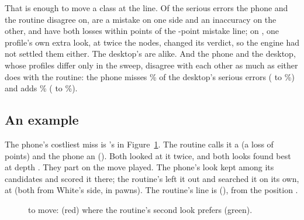 \documentclass[11pt]{article}
\begin{document}
That is enough to move a class at the line. Of the \PhoneDisagree{} serious errors the phone and the
routine disagree on, \PhoneFlips{} are a mistake on one side and an inaccuracy on the other, and
\PhoneNear{} have both losses within \Near{} points of the \MistakeLine-point mistake line; on
\PhoneUnsettled, one profile's own extra look, at twice the nodes, changed its verdict, so the engine
had not settled them either. The desktop's are alike. And the phone and the desktop, whose profiles
differ only in the sweep, disagree with each other as much as either does with the routine: the
phone misses \PvDMiss\% of the desktop's serious errors (\PvDMissLo{} to \PvDMissHi\%) and adds
\PvDExtra\% (\PvDExtraLo{} to \PvDExtraHi\%).

\begin{table}[h]
\centering
\scriptsize\ReadingsTable
\caption{Why the reviews part (added after the results were read; it tests nothing). On the moves
both the device and the routine looked at twice: how many, on how many the two looks reached the
same depth or gave the same numbers (the best move's score and the played move's), and the gap
between their losses. On the serious errors they disagree on: how many, how many are a mistake on one
side and an inaccuracy on the other, how many have both losses within \Near{} points of the
\MistakeLine-point line, and on how many either profile's extra look changed its verdict.}
\label{tab:readings}
\end{table}

\subsection{An example}

The phone's costliest miss is \ExampleSide's \ExampleMove{} in Figure~\ref{fig:example}. The
routine calls it a \ExampleRoutineCls{} (a loss of \ExampleRoutineLoss{} points) and the phone an
\ExamplePhoneCls{} (\ExamplePhoneLoss). Both looked at it twice, and both looks found
\ExampleBestMove{} best at depth \ExampleDepth. They part on the move played. The phone's look kept
\ExampleMove{} among its \ExampleCandidates{} candidates and scored it \ExamplePhonePlayed{} there;
the routine's left it out and searched it on its own, at \ExampleRoutinePlayed{} (both from White's
side, in pawns). The routine's line is \ExampleBest{} (\ExampleBestUci), from the position
\ExampleFen.

\begin{figure}[h]
\centering
\ExampleBoard
\caption{\ExampleSide{} to move: \ExampleMove{} (red) where the routine's second look prefers
\ExampleBestMove{} (green).}
\label{fig:example}
\end{figure}
\end{document}
